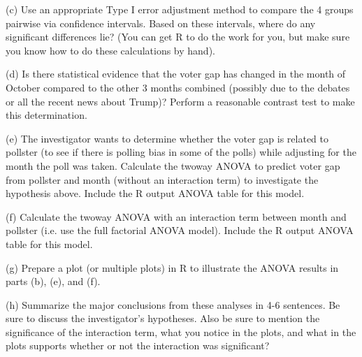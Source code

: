 \documentclass[11pt]{article}
\begin{document}
\noindent (c) Use an appropriate Type I error adjustment method to compare the 4 groups pairwise via confidence intervals.  Based on these intervals, where do any significant differences lie?  (You can get R to do the work for you, but make sure you know how to do these calculations by hand). 

\vspace{0.1in}

\noindent (d) Is there statistical evidence that the voter gap has changed in the month of October compared to the other 3 months combined (possibly due to the debates or all the recent news about Trump)?  Perform a reasonable contrast test to make this determination.

\vspace{0.1in}

\noindent (e) The investigator wants to determine whether the voter gap is related to pollster (to see if there is polling bias in some of the polls) while adjusting for the month the poll was taken.  Calculate the twoway ANOVA to predict voter gap from pollster and month (without an interaction term) to investigate the hypothesis above.  Include the R output ANOVA table for this model.

\vspace{0.1in}

\noindent (f) Calculate the twoway ANOVA with an interaction term between month and pollster (i.e. use the full factorial ANOVA model).  Include the R output ANOVA table for this model.

\vspace{0.1in}

\noindent (g) Prepare a plot (or multiple plots) in R to illustrate the ANOVA results in parts (b), (e), and (f).

\vspace{0.1in}

\noindent (h) Summarize the major conclusions from these analyses in 4-6 sentences.  Be sure to discuss the investigator's hypotheses.  Also be sure to mention the significance of the interaction term, what you notice in the plots, and what in the plots supports whether or not the interaction was significant?


\vspace{0.2in}
\end{document}
